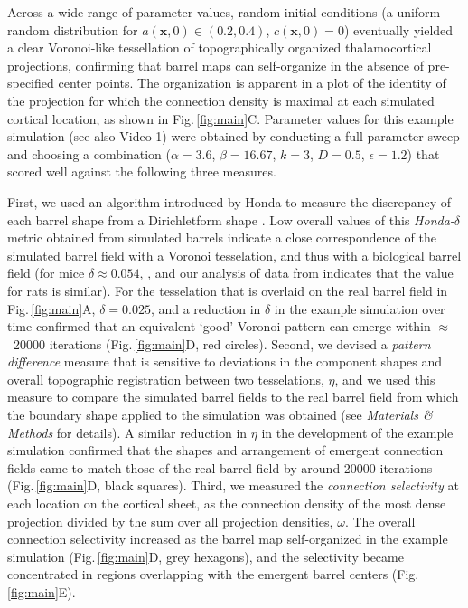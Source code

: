 \documentclass[9pt,lineno]{elife}
\newcommand{\cmnt}[1]{\textcolor{colcmnt}{#1}}
\newcommand{\mb}[1]{\mathbf{#1}}
\begin{document}
\cmnt{Across a wide range of parameter values, random initial conditions (a
  uniform random distribution for $a(\mb{x},0)\in(0.2,0.4)$, $c(\mb{x},0)=0$)
  eventually yielded a clear Voronoi-like tessellation of topographically
  organized thalamocortical projections, confirming that barrel maps can
  self-organize in the absence of pre-specified center points. The
  organization is apparent in a plot of the identity of the projection for
  which the connection density is maximal at each simulated cortical location,
  as shown in Fig.\,\ref{fig:main}C. Parameter values for this example simulation
  (see also Video 1) were obtained by
  conducting a full parameter sweep and choosing a combination
  ($\alpha=3.6$, $\beta=16.67$, $k=3$, $D=0.5$, $\epsilon=1.2$) that scored
  well against the following three measures.}

\cmnt{First, we used an algorithm introduced by Honda to measure the
  discrepancy of each barrel shape from a Dirichletform shape}
\citep{honda_geometrical_1983}.  \cmnt{Low overall values of this
  \emph{Honda-}$\delta$ metric obtained from simulated barrels indicate a
  close correspondence of the simulated barrel field with a Voronoi
  tesselation, and thus with a biological barrel field
  (for mice $\delta\approx0.054$,} \citealp{senft_mouse_1991}\cmnt{, and
  our analysis of data from} \citealp{zheng_signal_2001} \cmnt{ indicates that
  the value for rats is similar). For the tesselation
  that is overlaid on the real barrel field in Fig.\,\ref{fig:main}A,
  $\delta=0.025$, and a reduction in $\delta$ in the example simulation over
  time confirmed that an equivalent `good' Voronoi pattern can emerge
  within $\approx$~20000
  iterations (Fig.\,\ref{fig:main}D, red circles). Second, we devised a
  \emph{pattern difference} measure that is sensitive to deviations in the
  component shapes and overall topographic registration between two
  tesselations, $\eta$, and we used this measure to compare the simulated
  barrel fields to the real barrel field from which the boundary shape applied
  to the simulation was obtained (see \emph{Materials \& Methods} for
  details). A similar reduction in $\eta$ in the development of the example
  simulation confirmed that the shapes and arrangement of emergent connection
  fields came to match those of the real barrel field by around 20000
  iterations (Fig.\,\ref{fig:main}D, black squares). Third, we measured the
  \emph{connection selectivity} at each location on the cortical sheet, as the
  connection density of the most dense projection divided by the sum over all
  projection densities, $\omega$. The overall connection selectivity increased as the
  barrel map self-organized in the example simulation (Fig.\,\ref{fig:main}D,
  grey hexagons), and the selectivity became concentrated in regions
  overlapping with the emergent barrel centers (Fig.\,\ref{fig:main}E).}
\end{document}
